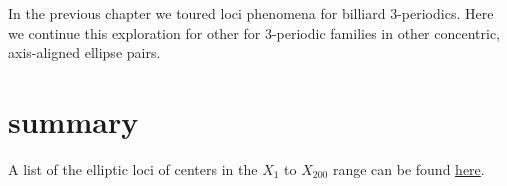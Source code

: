 In the previous chapter we toured loci phenomena for billiard 3-periodics. Here we continue this exploration for other for 3-periodic families in other concentric, axis-aligned ellipse pairs.


\section{summary}

A list of the elliptic loci of centers in the $X_{1}$ to $X_{200}$ range can be found \href{https://dan-reznik.github.io/why-so-many-ellipses/}{here}.